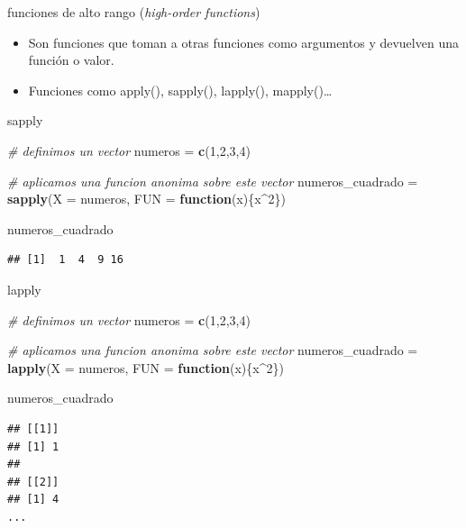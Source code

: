 \documentclass[ignorenonframetext,]{beamer}
\newenvironment{Shaded}{\begin{snugshade}}{\end{snugshade}}
\newcommand{\CommentTok}[1]{\textcolor[rgb]{0.56,0.35,0.01}{\textit{#1}}}
\newcommand{\ControlFlowTok}[1]{\textcolor[rgb]{0.13,0.29,0.53}{\textbf{#1}}}
\newcommand{\DataTypeTok}[1]{\textcolor[rgb]{0.13,0.29,0.53}{#1}}
\newcommand{\DecValTok}[1]{\textcolor[rgb]{0.00,0.00,0.81}{#1}}
\newcommand{\KeywordTok}[1]{\textcolor[rgb]{0.13,0.29,0.53}{\textbf{#1}}}
\newcommand{\NormalTok}[1]{#1}
\newcommand{\OperatorTok}[1]{\textcolor[rgb]{0.81,0.36,0.00}{\textbf{#1}}}
\newcommand{\StringTok}[1]{\textcolor[rgb]{0.31,0.60,0.02}{#1}}
\providecommand{\tightlist}{%
  \setlength{\itemsep}{0pt}\setlength{\parskip}{0pt}}
\begin{document}
\begin{frame}{funciones de alto rango (\emph{high-order functions})}
\protect\hypertarget{funciones-de-alto-rango-high-order-functions}{}

\begin{itemize}
\tightlist
\item
  Son funciones que toman a otras funciones como argumentos y devuelven
  una función o valor.
\item
  Funciones como apply(), sapply(), lapply(), mapply()\ldots{}
\end{itemize}

\end{frame}

\begin{frame}[fragile]{sapply}
\protect\hypertarget{sapply}{}

\begin{Shaded}
\begin{Highlighting}[]
\CommentTok{# definimos un vector}
\NormalTok{numeros =}\StringTok{ }\KeywordTok{c}\NormalTok{(}\DecValTok{1}\NormalTok{,}\DecValTok{2}\NormalTok{,}\DecValTok{3}\NormalTok{,}\DecValTok{4}\NormalTok{)}

\CommentTok{# aplicamos una funcion anonima sobre este vector}
\NormalTok{numeros_cuadrado =}\StringTok{ }\KeywordTok{sapply}\NormalTok{(}\DataTypeTok{X =}\NormalTok{ numeros, }\DataTypeTok{FUN =} \ControlFlowTok{function}\NormalTok{(x)\{x}\OperatorTok{^}\DecValTok{2}\NormalTok{\})}

\NormalTok{numeros_cuadrado}
\end{Highlighting}
\end{Shaded}

\begin{verbatim}
## [1]  1  4  9 16
\end{verbatim}

\end{frame}

\begin{frame}[fragile]{lapply}
\protect\hypertarget{lapply}{}

\begin{Shaded}
\begin{Highlighting}[]
\CommentTok{# definimos un vector}
\NormalTok{numeros =}\StringTok{ }\KeywordTok{c}\NormalTok{(}\DecValTok{1}\NormalTok{,}\DecValTok{2}\NormalTok{,}\DecValTok{3}\NormalTok{,}\DecValTok{4}\NormalTok{)}

\CommentTok{# aplicamos una funcion anonima sobre este vector}
\NormalTok{numeros_cuadrado =}\StringTok{ }\KeywordTok{lapply}\NormalTok{(}\DataTypeTok{X =}\NormalTok{ numeros, }\DataTypeTok{FUN =} \ControlFlowTok{function}\NormalTok{(x)\{x}\OperatorTok{^}\DecValTok{2}\NormalTok{\})}

\NormalTok{numeros_cuadrado}
\end{Highlighting}
\end{Shaded}

\begin{verbatim}
## [[1]]
## [1] 1
## 
## [[2]]
## [1] 4
...
\end{verbatim}

\end{frame}
\end{document}
